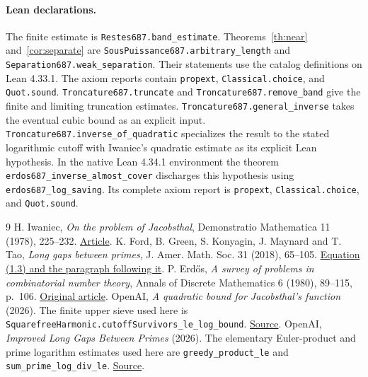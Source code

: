 \documentclass[11pt]{article}
\begin{document}
\paragraph{Lean declarations.}
The finite estimate is \texttt{Restes687.band\_estimate}.
Theorems~\ref{th:near} and~\ref{cor:separate} are
\texttt{SousPuissance687.arbitrary\_length} and
\texttt{Separation687.weak\_separation}. Their statements use the
catalog definitions on Lean 4.33.1. The axiom reports contain
\texttt{propext}, \texttt{Classical.choice}, and \texttt{Quot.sound}.
\texttt{Troncature687.truncate} and \texttt{Troncature687.remove\_band}
give the finite and limiting truncation estimates.
\texttt{Troncature687.general\_inverse} takes the eventual cubic bound
as an explicit input. \texttt{Troncature687.inverse\_of\_quadratic}
specializes the result to the stated logarithmic cutoff with Iwaniec's
quadratic estimate as its explicit Lean hypothesis.
In the native Lean 4.34.1 environment the theorem
\texttt{erdos687\_inverse\_almost\_cover} discharges this hypothesis
using \texttt{erdos687\_log\_saving}. Its complete axiom report is
\texttt{propext}, \texttt{Classical.choice}, and \texttt{Quot.sound}.

\begin{thebibliography}{9}
 H. Iwaniec, \emph{On the problem of Jacobsthal},
Demonstratio Mathematica 11 (1978), 225--232.
\href{https://doi.org/10.1515/dema-1978-0121}{Article}.
 K. Ford, B. Green, S. Konyagin, J. Maynard and T. Tao,
\emph{Long gaps between primes}, J. Amer. Math. Soc. 31 (2018), 65--105.
\href{https://arxiv.org/pdf/1412.5029}{Equation (1.3) and the paragraph following it}.
 P. Erd\H{o}s, \emph{A survey of problems in combinatorial
number theory}, Annals of Discrete Mathematics 6 (1980), 89--115,
p.~106. \href{https://combinatorica.hu/~p_erdos/1980-03.pdf}{Original article}.
 OpenAI, \emph{A quadratic bound for Jacobsthal's
function} (2026). The finite upper sieve used here is
\texttt{SquarefreeHarmonic.cutoffSurvivors\_le\_log\_bound}.
\href{https://github.com/openai/math/blob/adc7f1241b42e322a6451854ab7e4b4c146bf78a/lean/OAI/NumberTheory/Jacobsthal/Estimates/SquarefreeHarmonic.lean}{Source}.
 OpenAI, \emph{Improved Long Gaps Between Primes}
(2026). The elementary Euler-product and prime logarithm estimates used
here are \texttt{greedy\_product\_le} and \texttt{sum\_prime\_log\_div\_le}.
\href{https://github.com/openai/LongGapsBetweenPrimes/blob/03a1190d0bc5502d9f54eeb60ad3e45e22b0df0b/LongGapsBetweenPrimes.lean}{Source}.
\end{thebibliography}
\end{document}
